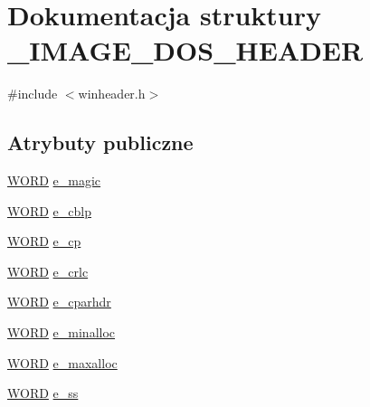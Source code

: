 \hypertarget{struct___i_m_a_g_e___d_o_s___h_e_a_d_e_r}{\section{Dokumentacja struktury \-\_\-\-I\-M\-A\-G\-E\-\_\-\-D\-O\-S\-\_\-\-H\-E\-A\-D\-E\-R}
\label{struct___i_m_a_g_e___d_o_s___h_e_a_d_e_r}
}


{\ttfamily \#include $<$winheader.\-h$>$}

\subsection*{Atrybuty publiczne}
\begin{DoxyCompactItemize}
\item 
\hyperlink{winheader_8h_ab24077addd3b7b13e086987ff296552c}{W\-O\-R\-D} \hyperlink{struct___i_m_a_g_e___d_o_s___h_e_a_d_e_r_a2395379130b4cc7d2d3e6982e6e3fc4c}{e\-\_\-magic}
\item 
\hyperlink{winheader_8h_ab24077addd3b7b13e086987ff296552c}{W\-O\-R\-D} \hyperlink{struct___i_m_a_g_e___d_o_s___h_e_a_d_e_r_a1bd42856267579ce345e062eca7545c5}{e\-\_\-cblp}
\item 
\hyperlink{winheader_8h_ab24077addd3b7b13e086987ff296552c}{W\-O\-R\-D} \hyperlink{struct___i_m_a_g_e___d_o_s___h_e_a_d_e_r_aaaa4b40f12deb3c4d6b23d106c3bfbce}{e\-\_\-cp}
\item 
\hyperlink{winheader_8h_ab24077addd3b7b13e086987ff296552c}{W\-O\-R\-D} \hyperlink{struct___i_m_a_g_e___d_o_s___h_e_a_d_e_r_a9c7b1e78d0a6491d4fa41363b5aefecc}{e\-\_\-crlc}
\item 
\hyperlink{winheader_8h_ab24077addd3b7b13e086987ff296552c}{W\-O\-R\-D} \hyperlink{struct___i_m_a_g_e___d_o_s___h_e_a_d_e_r_a880d14ac887440a6859c45a5b6c7db0c}{e\-\_\-cparhdr}
\item 
\hyperlink{winheader_8h_ab24077addd3b7b13e086987ff296552c}{W\-O\-R\-D} \hyperlink{struct___i_m_a_g_e___d_o_s___h_e_a_d_e_r_a5a82bb159167fe8e23fbbc06ffb85b2c}{e\-\_\-minalloc}
\item 
\hyperlink{winheader_8h_ab24077addd3b7b13e086987ff296552c}{W\-O\-R\-D} \hyperlink{struct___i_m_a_g_e___d_o_s___h_e_a_d_e_r_a65684758e3524a791a7a818322b57eea}{e\-\_\-maxalloc}
\item 
\hyperlink{winheader_8h_ab24077addd3b7b13e086987ff296552c}{W\-O\-R\-D} \hyperlink{struct___i_m_a_g_e___d_o_s___h_e_a_d_e_r_ae8cba7f40bb926f2218808e7bc2a5965}{e\-\_\-ss}

\end{DoxyCompactItemize}
